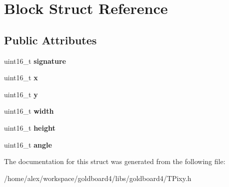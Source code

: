 \hypertarget{struct_block}{}\section{Block Struct Reference}
\label{struct_block}
\subsection*{Public Attributes}
\begin{DoxyCompactItemize}
\item 
uint16\+\_\+t {\bfseries signature}\hypertarget{struct_block_a4b09deb0955346ab3ee5f9d28d3dd24c}{}\label{struct_block_a4b09deb0955346ab3ee5f9d28d3dd24c}

\item 
uint16\+\_\+t {\bfseries x}\hypertarget{struct_block_af05be11b22efaf44b3b0712420838cbb}{}\label{struct_block_af05be11b22efaf44b3b0712420838cbb}

\item 
uint16\+\_\+t {\bfseries y}\hypertarget{struct_block_a86d0e413b7dd0346c3d0771f8dddba1c}{}\label{struct_block_a86d0e413b7dd0346c3d0771f8dddba1c}

\item 
uint16\+\_\+t {\bfseries width}\hypertarget{struct_block_a393b5c60f6a9ffbadc9645f882f71009}{}\label{struct_block_a393b5c60f6a9ffbadc9645f882f71009}

\item 
uint16\+\_\+t {\bfseries height}\hypertarget{struct_block_af83cd7a2f0b1bb7b8d0d04783028551d}{}\label{struct_block_af83cd7a2f0b1bb7b8d0d04783028551d}

\item 
uint16\+\_\+t {\bfseries angle}\hypertarget{struct_block_abfcbef5f0ab852d55f375ae4c3011555}{}\label{struct_block_abfcbef5f0ab852d55f375ae4c3011555}

\end{DoxyCompactItemize}


The documentation for this struct was generated from the following file\+:\begin{DoxyCompactItemize}
\item 
/home/alex/workspace/goldboard4/libs/goldboard4/T\+Pixy.\+h\end{DoxyCompactItemize}
